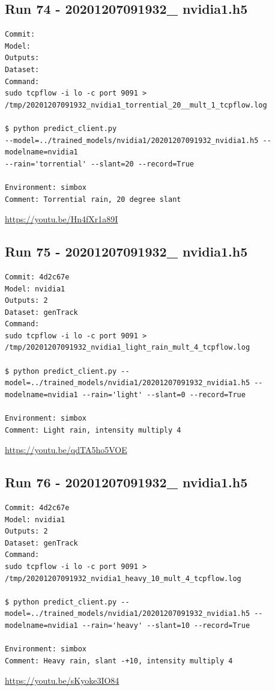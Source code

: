 \subsection{Run 74 - 20201207091932\_ nvidia1.h5}
\begin{verbatim}
Commit: 
Model: 
Outputs: 
Dataset: 
Command:
sudo tcpflow -i lo -c port 9091 >
/tmp/20201207091932_nvidia1_torrential_20__mult_1_tcpflow.log

$ python predict_client.py
--model=../trained_models/nvidia1/20201207091932_nvidia1.h5 --modelname=nvidia1
--rain='torrential' --slant=20 --record=True

Environment: simbox
Comment: Torrential rain, 20 degree slant
\end{verbatim}
\url{https://youtu.be/Hn4fXr1a89I}


\subsection{Run 75 - 20201207091932\_ nvidia1.h5 }
\begin{verbatim}
Commit: 4d2c67e
Model: nvidia1
Outputs: 2
Dataset: genTrack
Command:
sudo tcpflow -i lo -c port 9091 > /tmp/20201207091932_nvidia1_light_rain_mult_4_tcpflow.log

$ python predict_client.py --model=../trained_models/nvidia1/20201207091932_nvidia1.h5 --modelname=nvidia1 --rain='light' --slant=0 --record=True

Environment: simbox
Comment: Light rain, intensity multiply 4
\end{verbatim}
\url{https://youtu.be/qdTA5ho5VOE}

\subsection{Run 76 - 20201207091932\_ nvidia1.h5 }
\label{app_res:76}
\begin{verbatim}
Commit: 4d2c67e
Model: nvidia1
Outputs: 2
Dataset: genTrack
Command:
sudo tcpflow -i lo -c port 9091 > /tmp/20201207091932_nvidia1_heavy_10_mult_4_tcpflow.log

$ python predict_client.py --model=../trained_models/nvidia1/20201207091932_nvidia1.h5 --modelname=nvidia1 --rain='heavy' --slant=10 --record=True

Environment: simbox
Comment: Heavy rain, slant -+10, intensity multiply 4
\end{verbatim}
\url{https://youtu.be/sKyoke3IO84}

